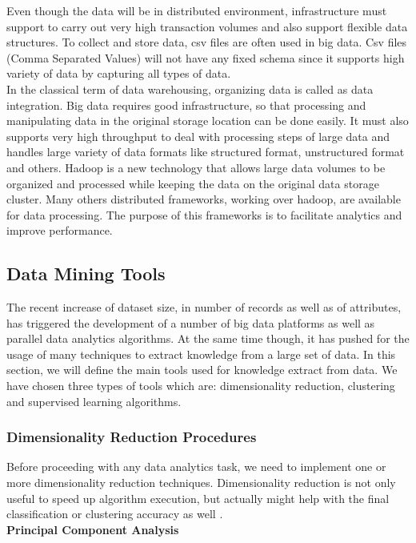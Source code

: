 Even though the data will be in distributed environment, infrastructure must support to carry out very high transaction volumes and also support flexible data structures. To collect and store data, csv files are often used in big data. Csv files (Comma Separated Values) will not have any fixed schema since it supports high variety of data by capturing all types of data.\\

In the classical term of data warehousing, organizing data is called as data integration. Big data requires good infrastructure, so that processing and manipulating data in the original storage location can be done easily. It must also supports very high throughput to deal with processing steps of large data and handles large variety of data formats like structured format, unstructured format and others. Hadoop is a new technology that allows large data volumes to be organized and processed while keeping the data on the original data storage cluster. Many others distributed frameworks, working over hadoop, are available for data processing. The purpose of this frameworks is to facilitate analytics and improve performance. 

\subsection{Data Mining Tools}
The recent increase of dataset size, in number of records as well as of attributes, has triggered the development of a number of big data platforms as well as parallel data analytics algorithms. At the same time though, it has pushed for the usage of many techniques to extract knowledge from a large set of data. In this section, we will define the main tools used for knowledge extract from data. We have chosen three types of tools which are: dimensionality reduction, clustering and supervised learning algorithms.
\subsubsection{Dimensionality Reduction Procedures}
\label{sectionpca}
Before proceeding with any data analytics task, we need to implement one or more dimensionality reduction techniques. Dimensionality reduction is not only useful to speed up algorithm execution, but actually might help with the final classification or clustering accuracy as well \cite{cite10}.\\ 

\textbf{\normalsize{Principal Component Analysis}}\\

